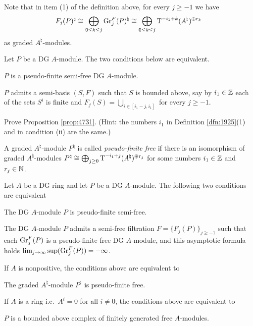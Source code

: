Note that in item (1) of the definition above, for every $j \geq -1$ we have
\begin{equation} \label{eqn:4736}
F_j(P)^{\natural} \cong 
\bigoplus_{0 \leq k \leq j}  \operatorname{Gr}^F_j(P)^{\natural}
\cong \bigoplus_{0 \leq k \leq j}  
\operatorname{T}^{-i_1 + k}(A^{\natural})^{\oplus r_k}
\end{equation}
as graded $A^{\natural}$-modules. 

\begin{prop} \label{prop:4731}
Let $P$ be a DG $A$-module. The two conditions below are equivalent. 
\begin{enumerate}
 $P$ is a pseudo-finite semi-free DG $A$-module.

 $P$ admits a semi-basis $(S, F)$ such that $S$ is bounded above, 
say by $i_1 \in \mathbb{Z}$\tup{;}
each of the sets $S^i$ is finite\tup{;} and 
$F_j(S) = \bigcup_{i \in [i_1 - j, i_1]}$
for every $j \geq -1$. 
\end{enumerate}
\end{prop}

\begin{exer} \label{exer:4731}
Prove Proposition \ref{prop:4731}. (Hint: the numbers $i_1$ in Definition 
\ref{dfn:1925}(1) and in condition (ii) are the same.)
\end{exer}
 
A graded $A^{\natural}$-module 
$P^{\natural}$ is called {\em pseudo-finite free} if there is an 
isomorphism of graded $A^{\natural}$-modules
$P^{\natural} \cong \bigoplus_{j \geq 0} 
\operatorname{T}^{-i_1 + j}(A^{\natural})^{\oplus r_j}$
for some numbers $i_1 \in \mathbb{Z}$ and $r_j \in \mathbb{N}$. 

\begin{prop} \label{prop:3175}
Let $A$ be a DG ring and let $P$ be a DG $A$-module. The following 
two conditions are equivalent\tup{:}
\begin{enumerate}
 The DG $A$-module $P$ is pseudo-finite semi-free.

 The DG $A$-module $P$ admits a semi-free filtration 
$F = \{ F_j(P) \}_{j \geq -1}$ such that 
each $\operatorname{Gr}^F_j(P)$ is a pseudo-finite free DG $A$-module, and this 
asymptotic formula holds\tup{:} 
$\lim_{j \to \infty} \operatorname{sup} (\operatorname{Gr}^F_j(P)) = - \infty$.
\end{enumerate}
If $A$ is nonpositive, the conditions above are equivalent to\tup{:} 
\begin{enumerate}
 The graded $A^{\natural}$-module $P^{\natural}$ is pseudo-finite 
free.
\end{enumerate}
If $A$ is a ring \tup{(}i.e.\ $A^i = 0$ for all $i \neq 0$\tup{)}, the 
conditions above are equivalent to\tup{:} 
\begin{enumerate}
 $P$ is a bounded above complex of finitely generated 
free $A$-modules. 
\end{enumerate}
\end{prop}

